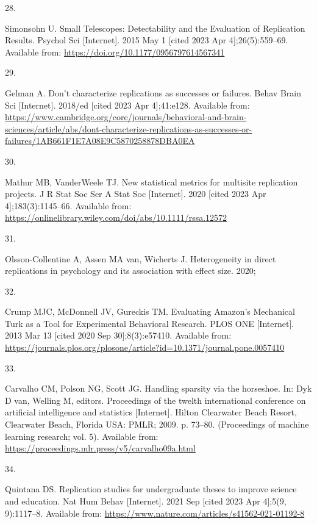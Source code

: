 \documentclass[
  english,
  a4paper,
]{article}
\newlength{\cslhangindent}
\newlength{\csllabelwidth}
\newlength{\cslentryspacingunit} %
\newenvironment{CSLReferences}[2] %
 {%
  \setlength{\parindent}{0pt}
  \ifodd #1
  \let\oldpar\par
  \def\par{\hangindent=\cslhangindent\oldpar}
  \fi
  \setlength{\parskip}{#2\cslentryspacingunit}
 }%
 {}
\newcommand{\CSLLeftMargin}[1]{\parbox[t]{\csllabelwidth}{#1}}
\newcommand{\CSLRightInline}[1]{\parbox[t]{\linewidth - \csllabelwidth}{#1}\break}
\begin{document}
\begin{CSLReferences}{0}{0}
\leavevmode{}%
\CSLLeftMargin{28. }%
\CSLRightInline{Simonsohn U. Small {Telescopes}: {Detectability} and the {Evaluation} of {Replication Results}. Psychol Sci {[}Internet{]}. 2015 May 1 {[}cited 2023 Apr 4{]};26(5):559--69. Available from: \url{https://doi.org/10.1177/0956797614567341}}

\leavevmode{}%
\CSLLeftMargin{29. }%
\CSLRightInline{Gelman A. Don't characterize replications as successes or failures. Behav Brain Sci {[}Internet{]}. 2018/ed {[}cited 2023 Apr 4{]};41:e128. Available from: \url{https://www.cambridge.org/core/journals/behavioral-and-brain-sciences/article/abs/dont-characterize-replications-as-successes-or-failures/1AB661F1E7A08E9C5870258878DBA0EA}}

\leavevmode{}%
\CSLLeftMargin{30. }%
\CSLRightInline{Mathur MB, VanderWeele TJ. New statistical metrics for multisite replication projects. J R Stat Soc Ser A Stat Soc {[}Internet{]}. 2020 {[}cited 2023 Apr 4{]};183(3):1145--66. Available from: \url{https://onlinelibrary.wiley.com/doi/abs/10.1111/rssa.12572}}

\leavevmode{}%
\CSLLeftMargin{31. }%
\CSLRightInline{Olsson-Collentine A, Assen MA van, Wicherts J. Heterogeneity in direct replications in psychology and its association with effect size. 2020; }

\leavevmode{}%
\CSLLeftMargin{32. }%
\CSLRightInline{Crump MJC, McDonnell JV, Gureckis TM. Evaluating {Amazon}'s {Mechanical Turk} as a {Tool} for {Experimental Behavioral Research}. PLOS ONE {[}Internet{]}. 2013 Mar 13 {[}cited 2020 Sep 30{]};8(3):e57410. Available from: \url{https://journals.plos.org/plosone/article?id=10.1371/journal.pone.0057410}}

\leavevmode{}%
\CSLLeftMargin{33. }%
\CSLRightInline{Carvalho CM, Polson NG, Scott JG. Handling sparsity via the horseshoe. In: Dyk D van, Welling M, editors. Proceedings of the twelth international conference on artificial intelligence and statistics {[}Internet{]}. Hilton Clearwater Beach Resort, Clearwater Beach, Florida USA: PMLR; 2009. p. 73--80. (Proceedings of machine learning research; vol. 5). Available from: \url{https://proceedings.mlr.press/v5/carvalho09a.html}}

\leavevmode{}%
\CSLLeftMargin{34. }%
\CSLRightInline{Quintana DS. Replication studies for undergraduate theses to improve science and education. Nat Hum Behav {[}Internet{]}. 2021 Sep {[}cited 2023 Apr 4{]};5(9, 9):1117--8. Available from: \url{https://www.nature.com/articles/s41562-021-01192-8}}


\end{CSLReferences}
\end{document}
